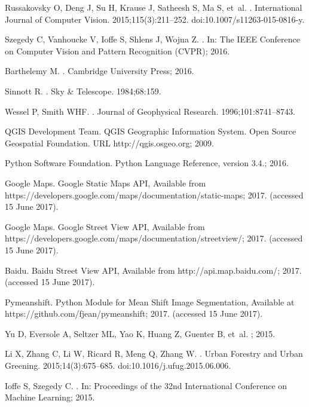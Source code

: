 Russakovsky O, Deng J, Su H, Krause J, Satheesh S, Ma S, et~al.
.
\newblock International Journal of Computer Vision. 2015;115(3):211--252.
\newblock doi:{10.1007/s11263-015-0816-y}.

Szegedy C, Vanhoucke V, Ioffe S, Shlens J, Wojna Z.
.
\newblock In: The IEEE Conference on Computer Vision and Pattern Recognition
  (CVPR); 2016.

Barthelemy M.
.
\newblock Cambridge University Press; 2016.

Sinnott R.
.
\newblock Sky {\&} Telescope. 1984;68:159.

Wessel P, Smith WHF.
.
\newblock Journal of Geophysical Research. 1996;101:8741--8743.

{QGIS Development Team}. {QGIS Geographic Information System. Open Source
  Geospatial Foundation. URL http://qgis.osgeo.org}; 2009.

{Python Software Foundation}. {Python Language Reference, version 3.4.}; 2016.

{Google Maps}. {Google Static Maps API, Available from
  https://developers.google.com/maps/documentation/static-maps}; 2017.
\newblock (accessed 15 June 2017).

{Google Maps}. {Google Street View API, Available from
  https://developers.google.com/maps/documentation/streetview/}; 2017.
\newblock (accessed 15 June 2017).

Baidu. {Baidu Street View API, Available from http://api.map.baidu.com/}; 2017.
\newblock (accessed 15 June 2017).

Pymeanshift. {Python Module for Mean Shift Image Segmentation, Available at
  https://github.com/fjean/pymeanshift}; 2017.
\newblock (accessed 15 June 2017).

Yu D, Eversole A, Seltzer ML, Yao K, Huang Z, Guenter B, et~al.
; 2015.

Li X, Zhang C, Li W, Ricard R, Meng Q, Zhang W.
.
\newblock Urban Forestry and Urban Greening. 2015;14(3):675--685.
\newblock doi:{10.1016/j.ufug.2015.06.006}.

Ioffe S, Szegedy C.
.
\newblock In: Proceedings of the 32nd International Conference on Machine
  Learning; 2015.
